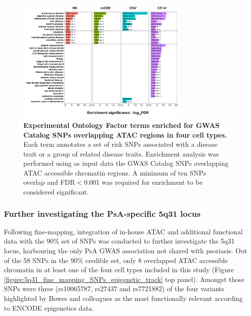 \begin{figure}[htbp]
\centering
\includegraphics[width=0.75\textwidth]{./Results3/pdfs/Enrichment_for_FM_GWAS_cat_SNPs_overlapping_ATAC}
\caption[Experimental Factor Ontology terms enriched in GWAS Catalog SNPs overlapping ATAC regions in four cell types.]{\textbf{Experimental Ontology Factor terms enriched for GWAS Catalog SNPs overlapping ATAC regions in four cell types.} Each term annotates a set of risk SNPs associated with a disease trait or a group of related disease traits. Enrichment analysis was performed using as input data the GWAS Catalog SNPs overlapping ATAC accessible chromatin regions. A minimum of ten SNPs overlap and FDR$<$0.001 was required for enrichment to be considered significant.}
\label{figure:GWAS_traits_enriched_for_ATAC_ML}
\end{figure}



\subsubsection{Further investigating the PsA-specific 5q31 locus}
Following fine-mapping, integration of in-house ATAC and additional functional data with the 90\% set of SNPs was conducted to further investigate the 5q31 locus, harbouring the only PsA GWAS association not shared with psoriasis. Out of the 58 SNPs in the 90\% credible set, only 8 overlapped ATAC accessible chromatin in at least one of the four cell types included in this study (Figure \ref{figure:5q31_fine_mapping_SNPs_epigenetic_track} top panel). Amongst those SNPs were three (rs10065787, rs27437 and rs7721882) of the four variants highlighted by Bowes and colleagues as the most functionally relevant according to ENCODE epigenetics data. 


